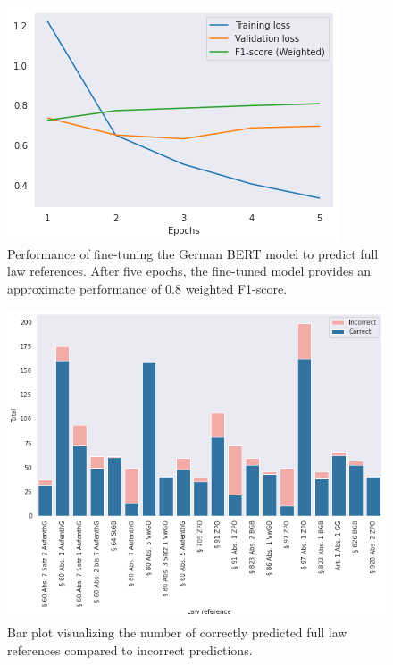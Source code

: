 \documentclass[sigconf]{acmart}
\begin{document}
\begin{figure}[h]
	\centering
	\includegraphics[width=0.9\linewidth]{latex/full_plot.png}
	\caption{Performance of fine-tuning the German BERT model to predict full law references. After five epochs, the fine-tuned model provides an approximate performance of 0.8 weighted F1-score.}
	\label{fig:full_plot}
\end{figure}

\begin{figure}[h]
	\centering
	\includegraphics[width=1\linewidth]{latex/full_bar_plot.png}
	\caption{Bar plot visualizing the number of correctly predicted full law references compared to incorrect predictions.}
	\label{fig:full_bar_plot}
\end{figure}
\end{document}
